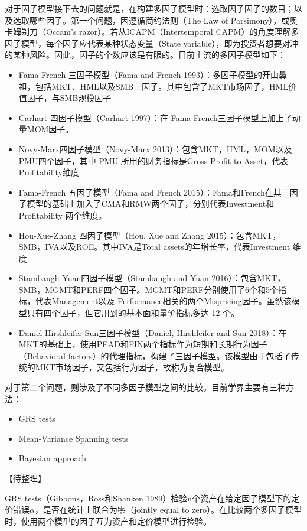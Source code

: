 \documentclass[11pt]{article}
\begin{document}
对于因子模型接下去的问题就是，在构建多因子模型时：选取因子因子的数目；以及选取哪些因子。第一个问题，因遵循简约法则（The Law of Parsimony），或奥卡姆剃刀（Occam's razor）。若从ICAPM（Intertemporal CAPM）的角度理解多因子模型，每个因子应代表某种状态变量（State variable），即为投资者想要对冲的某种风险。因此，因子的个数应该是有限的。目前主流的多因子模型如下：
\begin{itemize}
    \item Fama-French 三因子模型（Fama and French 1993）：多因子模型的开山鼻祖，包括MKT、HML以及SMB三因子。其中包含了MKT市场因子，HML价值因子，与SMB规模因子
    \item Carhart 四因子模型（Carhart 1997）：在 Fama-French三因子模型上加上了动量MOM因子。
    \item Novy-Marx四因子模型（Novy-Marx 2013）：包含MKT，HML，MOM以及PMU四个因子，其中 PMU 所用的财务指标是Gross Profit-to-Asset，代表Profitability维度
    \item Fama-French 五因子模型（Fama and French 2015）：Fama和French在其三因子模型的基础上加入了CMA和RMW两个因子，分别代表Investment和Profitability 两个维度。
    \item Hou-Xue-Zhang 四因子模型（Hou, Xue and Zhang 2015）：包含MKT，SMB，IVA以及ROE。其中IVA是Total assets的年增长率，代表Investment 维度
    \item Stambaugh-Yuan四因子模型（Stambaugh and Yuan 2016）：包含MKT，SMB，MGMT和PERF四个因子。MGMT和PERF分别使用了6个和5个指标，代表Management以及 Performance相关的两个Mispricing因子。虽然该模型只有四个因子，但它用到的基本面和量价指标多达 12 个。
    \item Daniel-Hirshleifer-Sun三因子模型（Daniel, Hirshleifer and Sun 2018）：在MKT的基础上，使用PEAD和FIN两个指标作为短期和长期行为因子（Behavioral factors）的代理指标，构建了三因子模型。该模型由于包括了传统的MKT市场因子，又包括行为因子，故称为复合模型。
\end{itemize}

对于第二个问题，则涉及了不同多因子模型之间的比较。目前学界主要有三种方法：
\begin{itemize}
    \item GRS tests
    \item Mean-Variance Spanning tests
    \item Bayesian approach
\end{itemize}

【待整理】

GRS tests（Gibbons，Ross和Shanken 1989）检验n个资产在给定因子模型下的定价错误$\alpha$，是否在统计上联合为零（jointly equal to zero）。在比较两个多因子模型时，使用两个模型的因子互为资产和定价模型进行检验。
\end{document}
